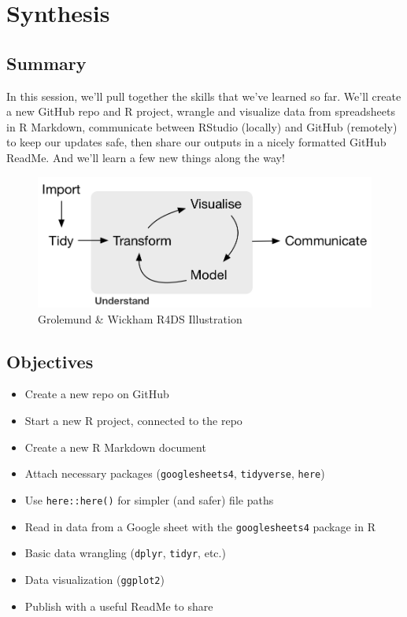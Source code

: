\documentclass[]{book}
\providecommand{\tightlist}{%
  \setlength{\itemsep}{0pt}\setlength{\parskip}{0pt}}
\begin{document}
\hypertarget{synthesis}{%
\chapter{Synthesis}\label{synthesis}}

\hypertarget{summary-7}{%
\section{Summary}\label{summary-7}}

In this session, we'll pull together the skills that we've learned so far. We'll create a new GitHub repo and R project, wrangle and visualize data from spreadsheets in R Markdown, communicate between RStudio (locally) and GitHub (remotely) to keep our updates safe, then share our outputs in a nicely formatted GitHub ReadMe. And we'll learn a few new things along the way!

\begin{figure}
\centering
\includegraphics{img/r4ds_data-science.png}
\caption{Grolemund \& Wickham R4DS Illustration}
\end{figure}

\hypertarget{objectives-7}{%
\section{Objectives}\label{objectives-7}}

\begin{itemize}
\tightlist
\item
  Create a new repo on GitHub
\item
  Start a new R project, connected to the repo
\item
  Create a new R Markdown document
\item
  Attach necessary packages (\texttt{googlesheets4}, \texttt{tidyverse}, \texttt{here})
\item
  Use \texttt{here::here()} for simpler (and safer) file paths
\item
  Read in data from a Google sheet with the \texttt{googlesheets4} package in R
\item
  Basic data wrangling (\texttt{dplyr}, \texttt{tidyr}, etc.)
\item
  Data visualization (\texttt{ggplot2})
\item
  Publish with a useful ReadMe to share
\end{itemize}
\end{document}
